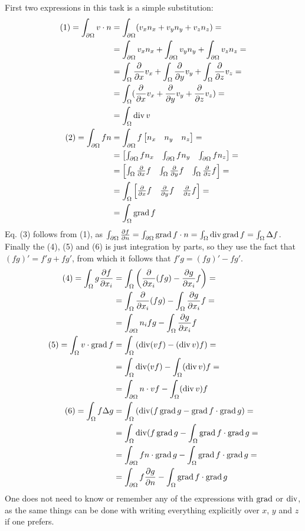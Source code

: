 \documentclass[12pt,class=article,crop=false,preview=false]{standalone}
\begin{document}
\begin{solution}
First two expressions in this task is a simple substitution:
\begin{align*}
    (1) = \int_{\partial\Omega} v\cdot n
    &= \int_{\partial\Omega} (v_xn_x+v_yn_y+v_zn_z) = \\
    &= \int_{\partial\Omega} v_xn_x + \int_{\partial\Omega}v_yn_y + \int_{\partial\Omega}v_zn_z = \\
    &= \int_{\Omega} \frac{\partial}{\partial x}v_x + \int_{\Omega} \frac{\partial}{\partial y}v_y + \int_{\Omega} \frac{\partial}{\partial z}v_z = \\
    &= \int_{\Omega} (\frac{\partial}{\partial x}v_x + \frac{\partial}{\partial y}v_y + \frac{\partial}{\partial z}v_z) = \\
    &= \int_{\Omega} \operatorname{div} v\\
    (2) = \int_{\partial\Omega} f n
    &= \int_{\partial\Omega} f \left[\begin{matrix}n_x & n_y & n_z\end{matrix}\right] = \\
    &= \left[\begin{matrix}\int_{\partial\Omega} f n_x & \int_{\partial\Omega} f n_y & \int_{\partial\Omega} f n_z\end{matrix}\right] = \\
    &= \left[\begin{matrix}\int_{\Omega} \frac{\partial}{\partial x}f & \int_{\Omega} \frac{\partial}{\partial y}f & \int_{\Omega} \frac{\partial}{\partial z}f\end{matrix}\right] = \\
    &= \int_{\Omega} \left[\begin{matrix}\frac{\partial}{\partial x}f & \frac{\partial}{\partial y}f & \frac{\partial}{\partial z}f\end{matrix}\right] = \\
    &= \int_{\Omega} \operatorname{grad} f
\end{align*}
Eq. (3) follows from (1), as $\int_{\partial\Omega} \frac{\partial f}{\partial n} = \int_{\partial\Omega} \operatorname{grad}{f}\cdot n = \int_{\Omega} \operatorname{div}\operatorname{grad}{f} = \int_{\Omega} \Delta f$. Finally the (4), (5) and (6) is just integration by parts, so they use the fact that $(fg)' = f'g + fg'$, from which it follows that $f'g = (fg)' - fg'$.
\begin{align*}
(4) = \int_\Omega g\frac{\partial f}{\partial x_i}
&= \int_\Omega \left(\frac{\partial}{\partial x_i}(fg) - \frac{\partial g}{\partial x_i}f\right) =\\
&= \int_\Omega \frac{\partial}{\partial x_i}(fg) - \int_\Omega \frac{\partial g}{\partial x_i}f =\\
&= \int_{\partial\Omega} n_i fg - \int_\Omega \frac{\partial g}{\partial x_i}f\\
(5) = \int_\Omega v\cdot\operatorname{grad}{f}
&= \int_\Omega \left(\operatorname{div}(vf) - (\operatorname{div} v)f\right) =\\
&= \int_\Omega\operatorname{div}(vf) - \int_\Omega(\operatorname{div} v)f =\\
&= \int_{\partial\Omega}n\cdot vf - \int_\Omega(\operatorname{div} v)f\\
(6) = \int_\Omega f\Delta{g}
&= \int_\Omega \left(\operatorname{div}(f\operatorname{grad}{g} - \operatorname{grad}{f}\cdot\operatorname{grad}{g}\right) =\\
&= \int_\Omega\operatorname{div}(f\operatorname{grad}{g} - \int_\Omega \operatorname{grad}{f}\cdot\operatorname{grad}{g} =\\
&= \int_{\partial\Omega}fn\cdot\operatorname{grad}{g} - \int_\Omega \operatorname{grad}{f}\cdot\operatorname{grad}{g} =\\
&= \int_{\partial\Omega}f\frac{\partial g}{\partial n} - \int_\Omega \operatorname{grad}{f}\cdot\operatorname{grad}{g}\\
\end{align*}
One does not need to know or remember any of the expressions with $\operatorname{grad}$ or $\operatorname{div}$, as the same things can be done with writing everything explicitly over $x$, $y$ and $z$ if one prefers.
\end{solution}
\end{document}
